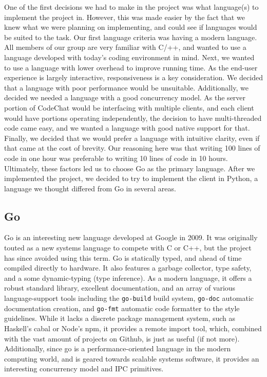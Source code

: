 \documentclass[12pt, letterpaper]{article}
\begin{document}
One of the first decisions we had to make in the project was what
language(s) to implement the project in. However, this was made easier
by the fact that we knew what we were planning on implementing, and
could see if languages would be suited to the task. Our first language
criteria was having a modern language. All members of our group are
very familiar with C/++, and wanted to use a language developed with
today's coding environment in mind. Next, we wanted to use a language
with lower overhead to improve running time. As the end-user experience
is largely interactive, responsiveness is a key consideration. We
decided that a language with poor performance would be unsuitable.
Additionally, we decided we needed a language with a good concurrency
model. As the server portion of CodeChat would be interfacing with
multiple clients, and each client would have portions operating
independently, the decision to have multi-threaded code came easy, and
we wanted a language with good native support for that. Finally, we
decided that we would prefer a language with intuitive clarity, even if
that came at the cost of brevity. Our reasoning here was that writing
100 lines of code in one hour was preferable to writing 10 lines of
code in 10 hours. Ultimately, these factors led us to choose Go as the
primary language. After we implemented the project, we decided to try
to implement the client in Python, a language we thought differed from
Go in several areas.


\subsection*{Go}


Go is an interesting new language developed at Google in 2009. It was 
originally touted as a new systems language to compete with C or C++, 
but the project has since avoided using this term. Go is statically 
typed, and ahead of time compiled directly to hardware. It also 
features a garbage collector, type safety, and a some dynamic-typing 
(type inference). As a modern language, it offers a robust standard 
library, excellent documentation, and an array of various 
language-support tools including the \verb+go-build+ build system, 
\verb+go-doc+ automatic documentation creation, and \verb+go-fmt+ 
automatic code formatter to the style guidelines. While it lacks a 
discrete package management system, such as Haskell's cabal or Node's 
npm, it provides a remote import tool, which, combined with the vast 
amount of projects on Github, is just as useful (if not more). 
Additionally, since go is a performance-oriented language in the modern 
computing world, and is geared towards scalable systems software, it 
provides an interesting concurrency model and IPC primitives.
\end{document}
